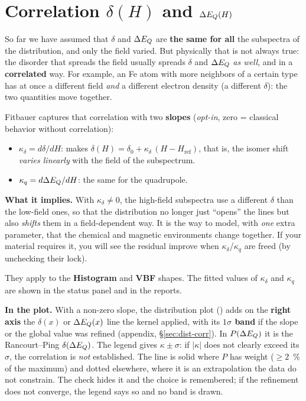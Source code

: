 \section{Correlation $\delta(H)$ and $\Delta E_{Q}(H)$}
\label{sec:correlacion}

So far we have assumed that $\delta$ and $\Delta E_{Q}$ are \textbf{the same for all} the
subspectra of the distribution, and only the field varied. But physically that is
not always true: the disorder that spreads the field usually spreads $\delta$ and
$\Delta E_{Q}$ \emph{as well}, and in a \textbf{correlated} way. For example, an Fe atom with
more neighbors of a certain type has at once a different field \emph{and} a different
electron density (a different $\delta$): the two quantities move together.

Fitbauer captures that correlation with two \textbf{slopes} (\emph{opt-in}, zero =
classical behavior without correlation):

\begin{itemize}[nosep]
  \item $\kappa_\delta = d\delta/dH$: makes $\delta(H) = \delta_0 +
        \kappa_\delta\,(H-H_{\text{ref}})$, that is, the isomer shift \emph{varies
        linearly} with the field of the subspectrum.
  \item $\kappa_q = d\Delta E_{Q}/dH$: the same for the quadrupole.
\end{itemize}

\textbf{What it implies.} With $\kappa_\delta \neq 0$, the high-field subspectra use
a different $\delta$ than the low-field ones, so that the distribution no longer just
``opens'' the lines but also \emph{shifts} them in a field-dependent way. It is the
way to model, with \emph{one} extra parameter, that the chemical and magnetic
environments change together. If your material requires it, you will see the residual
improve when $\kappa_\delta$/$\kappa_q$ are freed (by unchecking their lock).

They apply to the \textbf{Histogram} and \textbf{VBF} shapes. The fitted values of
$\kappa_\delta$ and $\kappa_q$ are shown in the status panel and in the reports.

\textbf{In the plot.} With a non-zero slope, the distribution plot
() adds on the \textbf{right axis} the $\delta(x)$ or
$\Delta E_{Q}(x)$ line the kernel applied, with its \textbf{$1\sigma$ band} if the slope or
the global value was refined (appendix, \S\ref{sec:dist-corr}). In $P(\Delta E_{Q})$ it is
the Rancourt--Ping $\delta(\Delta E_{Q})$. The legend gives $\kappa\pm\sigma$: if $|\kappa|$
does not clearly exceed its $\sigma$, the correlation is \emph{not} established.
The line is solid where $P$ has weight ($\ge 2$~\% of the maximum) and dotted
elsewhere, where it is an extrapolation the data do not constrain. The
 check hides it and the choice is remembered; if the
refinement does not converge, the legend says so and no band is drawn.

